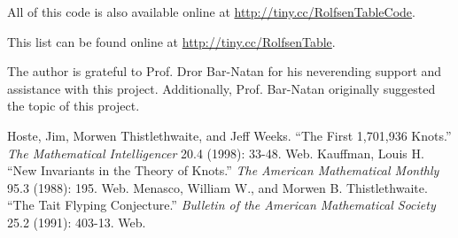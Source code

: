 \begin{paper}
All of this code is also available online at
\url{http://tiny.cc/RolfsenTableCode}.


\noindent{}



\noindent{}










\noindent{}

\fontsize{12pt}{12pt}\selectfont
{}


This list can be found online at \url{http://tiny.cc/RolfsenTable}.


The author is grateful to Prof. Dror Bar-Natan for his neverending support and
assistance with this project.
Additionally, Prof. Bar-Natan originally suggested the topic of this project.


\begin{thebibliography}{}
Hoste, Jim, Morwen Thistlethwaite, and Jeff Weeks.
``The First 1,701,936 Knots.''
\textit{The Mathematical Intelligencer}
20.4 (1998): 33-48. Web.
Kauffman, Louis H.
``New Invariants in the Theory of Knots.''
\textit{The American Mathematical Monthly}
95.3 (1988): 195. Web.
Menasco, William W., and Morwen B. Thistlethwaite.
``The Tait Flyping Conjecture.''
\textit{Bulletin of the American Mathematical Society}
25.2 (1991): 403-13. Web.
\end{thebibliography}

\end{paper}

